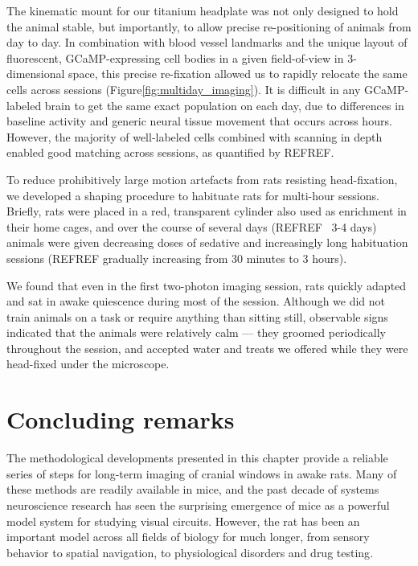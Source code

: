 The kinematic mount for our titanium headplate was not only designed to hold the animal stable, but importantly, to allow precise re-positioning of animals from day to day. In combination with blood vessel landmarks and the unique layout of fluorescent, GCaMP-expressing cell bodies in a given field-of-view in 3-dimensional space, this precise re-fixation allowed us to rapidly relocate the same cells across sessions (Figure\ref{fig:multiday_imaging}). It is difficult in any GCaMP-labeled brain to get the same exact population on each day, due to differences in baseline activity and generic neural tissue movement that occurs across hours. However, the majority of well-labeled cells combined with scanning in depth enabled good matching across sessions, as quantified by REFREF. 


To reduce prohibitively large motion artefacts from rats resisting head-fixation, we developed a shaping procedure to habituate rats for multi-hour sessions. Briefly, rats were placed in a red, transparent cylinder also used as enrichment in their home cages, and over the course of several days (REFREF ~3-4 days) animals were given decreasing doses of sedative and increasingly long habituation sessions (REFREF gradually increasing from 30 minutes to 3 hours).

We found that even in the first two-photon imaging session, rats quickly adapted and sat in awake quiescence during most of the session. Although we did not train animals on a task or require anything than sitting still, observable signs indicated that the animals were relatively calm --- they groomed periodically throughout the session, and accepted water and treats we offered while they were head-fixed under the microscope. 

\section{Concluding remarks}
The methodological developments presented in this chapter provide a reliable series of steps for long-term imaging of cranial windows in awake rats. Many of these methods are readily available in mice, and the past decade of systems neuroscience research has seen the surprising emergence of mice as a powerful model system for studying visual circuits. However, the rat has been an important model across all fields of biology for much longer, from sensory behavior\cite{Lashley1930, REFREF} to spatial navigation\cite{REFREF}, to physiological disorders and drug testing\cite{REFREF}. 


